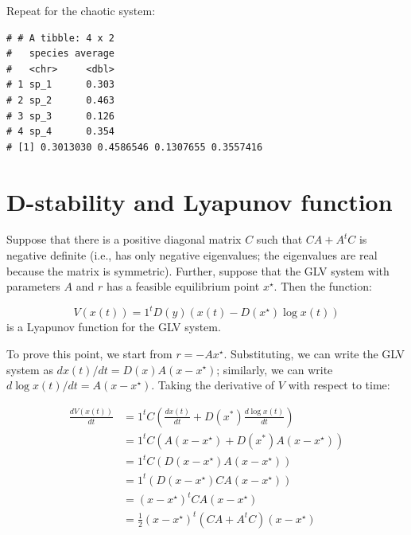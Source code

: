 \documentclass[]{book}
\newenvironment{Shaded}{\begin{snugshade}}{\end{snugshade}}
\newcommand{\CommentTok}[1]{\textcolor[rgb]{0.56,0.35,0.01}{\textit{#1}}}
\newcommand{\DataTypeTok}[1]{\textcolor[rgb]{0.13,0.29,0.53}{#1}}
\newcommand{\DecValTok}[1]{\textcolor[rgb]{0.00,0.00,0.81}{#1}}
\newcommand{\KeywordTok}[1]{\textcolor[rgb]{0.13,0.29,0.53}{\textbf{#1}}}
\newcommand{\NormalTok}[1]{#1}
\newcommand{\OperatorTok}[1]{\textcolor[rgb]{0.81,0.36,0.00}{\textbf{#1}}}
\newcommand{\StringTok}[1]{\textcolor[rgb]{0.31,0.60,0.02}{#1}}
\begin{document}
Repeat for the chaotic system:

\begin{Shaded}
\end{Shaded}

\begin{verbatim}
# # A tibble: 4 x 2
#   species average
#   <chr>     <dbl>
# 1 sp_1      0.303
# 2 sp_2      0.463
# 3 sp_3      0.126
# 4 sp_4      0.354
# [1] 0.3013030 0.4586546 0.1307655 0.3557416
\end{verbatim}

\hypertarget{d-stability-and-lyapunov-function}{%
\section{D-stability and Lyapunov function}\label{d-stability-and-lyapunov-function}}

Suppose that there is a positive diagonal matrix \(C\) such that \(CA + A^t C\) is negative definite (i.e., has only negative eigenvalues; the eigenvalues are real because the matrix is symmetric). Further, suppose that the GLV system with parameters \(A\) and \(r\) has a feasible equilibrium point \(x^\star\). Then the function:

\[
V(x(t)) = 1^t D(y) \left( x(t) -D(x^\star) \log x(t)\right)
\]
is a Lyapunov function for the GLV system.

To prove this point, we start from \(r = -Ax^\star\). Substituting, we can write the GLV system as \(dx(t)/dt = D(x)A(x - x^\star)\); similarly, we can write \(d \log x(t)/dt = A(x - x^\star)\). Taking the derivative of \(V\) with respect to time:

\[
\begin{aligned}
 \frac{d V(x(t))}{dt} &= 1^t C \left(\frac{d x(t)}{dt}  + D(x^*) \frac{d \log x(t)}{dt} \right)\\
 &= 1^t C \left(A (x - x^\star)  + D(x^*) A (x - x^\star) \right)\\
 &= 1^t C \left(D(x - x^\star)  A (x - x^\star) \right)\\
 &= 1^t \left(D(x - x^\star)  C A (x - x^\star) \right)\\
 &= (x - x^\star)^t  CA (x - x^\star)\\
 &= \frac{1}{2}(x - x^\star)^t  (CA + A^t C) (x - x^\star)\\
\end{aligned}
\]
\end{document}
